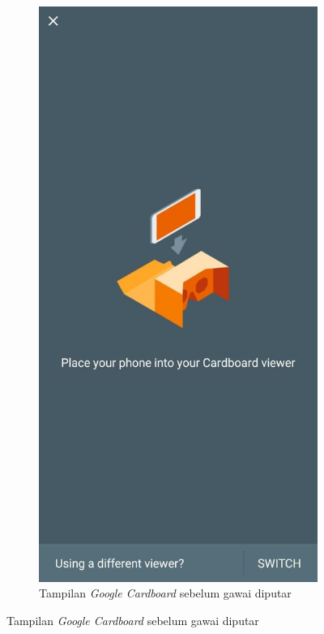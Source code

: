 \begin{figure}[!hp]
  \hfill
  \begin{subfigure}[b]{0.3\textwidth}
    \includegraphics[width=\textwidth]{Gambar/cardboard-page.png}
    \caption{Tampilan \textit{Google Cardboard} sebelum gawai diputar}
    \label{fig:cardboard-page}
  \end{subfigure}
\end{figure}



